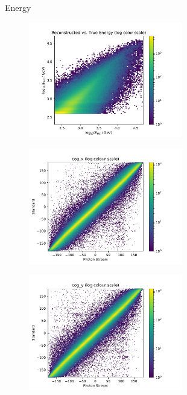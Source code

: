 \begin{frame}[t]{Energy}
    \begin{figure}
        \centering
        \includegraphics[width=0.6\textwidth,page=4]{fig/energy-performance.pdf}
    \end{figure}
\end{frame}

\begin{frame}[t]
    \begin{figure}
        \centering
        \includegraphics[width=0.6\textwidth]{fig/cog_x_compare.pdf}
    \end{figure}
\end{frame}

\begin{frame}[t]
    \begin{figure}
        \centering
        \includegraphics[width=0.6\textwidth]{fig/cog_y_compare.pdf}
    \end{figure}
\end{frame}

